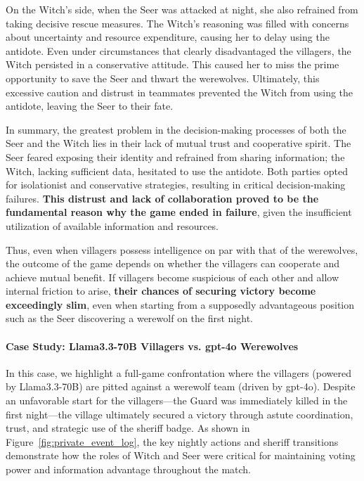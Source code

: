 On the Witch’s side, when the Seer was attacked at night, she also refrained from taking decisive rescue measures. The Witch’s reasoning was filled with concerns about uncertainty and resource expenditure, causing her to delay using the antidote. Even under circumstances that clearly disadvantaged the villagers, the Witch persisted in a conservative attitude. This caused her to miss the prime opportunity to save the Seer and thwart the werewolves. Ultimately, this excessive caution and distrust in teammates prevented the Witch from using the antidote, leaving the Seer to their fate.

In summary, the greatest problem in the decision-making processes of both the Seer and the Witch lies in their lack of mutual trust and cooperative spirit. The Seer feared exposing their identity and refrained from sharing information; the Witch, lacking sufficient data, hesitated to use the antidote. Both parties opted for isolationist and conservative strategies, resulting in critical decision-making failures. \textbf{This distrust and lack of collaboration proved to be the fundamental reason why the game ended in failure}, given the insufficient utilization of available information and resources.

Thus, even when villagers possess intelligence on par with that of the werewolves, the outcome of the game depends on whether the villagers can cooperate and achieve mutual benefit. If villagers become suspicious of each other and allow internal friction to arise, \textbf{their chances of securing victory become exceedingly slim}, even when starting from a supposedly advantageous position such as the Seer discovering a werewolf on the first night.

\paragraph{Case Study: Llama3.3-70B Villagers vs. gpt-4o Werewolves}
\label{sec:case_llama33_gpt4o}
In this case, we highlight a full-game confrontation where the villagers (powered by Llama3.3-70B) 
are pitted against a werewolf team (driven by gpt-4o). Despite an unfavorable start for the villagers---the Guard 
was immediately killed in the first night---the village ultimately secured a victory through astute coordination, 
trust, and strategic use of the sheriff badge.
As shown in Figure~\ref{fig:private_event_log}, the key nightly actions and sheriff transitions 
demonstrate how the roles of Witch and Seer were critical for maintaining voting power 
and information advantage throughout the match.

